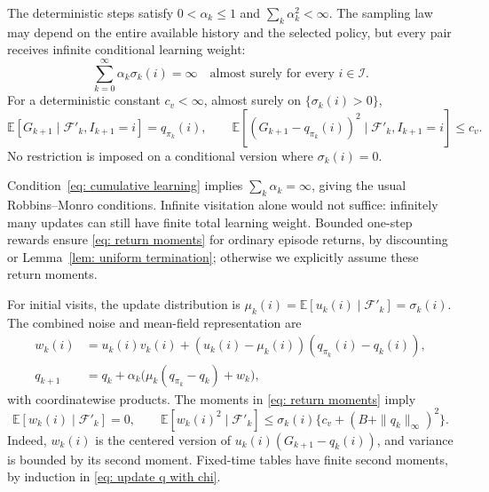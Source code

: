 \begin{assumption}\label{asp: standing}
The deterministic steps satisfy $0<\alpha_k\le1$ and $\sum_k\alpha_k^2<\infty$. The sampling law may depend on the entire available history and the selected policy, but every pair receives infinite conditional learning weight:
\begin{equation}\label{eq: cumulative learning}
\sum_{k=0}^\infty\alpha_k\sigma_k(i)=\infty\quad\text{almost surely for every }i\in\mathcal I.
\end{equation}
For a deterministic constant $c_v<\infty$, almost surely on $\{\sigma_k(i)>0\}$,
\begin{equation}\label{eq: return moments}
\mathbb E[G_{k+1}\mid\mathcal F'_k,I_{k+1}=i]=q_{\pi_k}(i),\qquad
\mathbb E[(G_{k+1}-q_{\pi_k}(i))^2\mid\mathcal F'_k,I_{k+1}=i]\le c_v.
\end{equation}
No restriction is imposed on a conditional version where $\sigma_k(i)=0$.
\end{assumption}
Condition~\eqref{eq: cumulative learning} implies $\sum_k\alpha_k=\infty$, giving the usual Robbins--Monro conditions. Infinite visitation alone would not suffice: infinitely many updates can still have finite total learning weight. Bounded one-step rewards ensure \eqref{eq: return moments} for ordinary episode returns, by discounting or Lemma~\ref{lem: uniform termination}; otherwise we explicitly assume these return moments.

For initial visits, the update distribution is $\mu_k(i)=\mathbb E[u_k(i)\mid\mathcal F'_k]=\sigma_k(i)$. The combined noise and mean-field representation are
\begin{align}
 w_k(i)&=u_k(i)v_k(i)+(u_k(i)-\mu_k(i))(q_{\pi_k}(i)-q_k(i)),\label{eq: definition combined noise}\\
 q_{k+1}&=q_k+\alpha_k\bigl(\mu_k(q_{\pi_k}-q_k)+w_k\bigr),\label{eq: mcopi sa}
\end{align}
with coordinatewise products. The moments in \eqref{eq: return moments} imply
\begin{equation}\label{eq: combined moments}
\mathbb E[w_k(i)\mid\mathcal F'_k]=0,\qquad
\mathbb E[w_k(i)^2\mid\mathcal F'_k]\le\sigma_k(i)\{c_v+(B+\|q_k\|_\infty)^2\}.
\end{equation}
Indeed, $w_k(i)$ is the centered version of $u_k(i)(G_{k+1}-q_k(i))$, and variance is bounded by its second moment. Fixed-time tables have finite second moments, by induction in \eqref{eq: update q with chi}.

